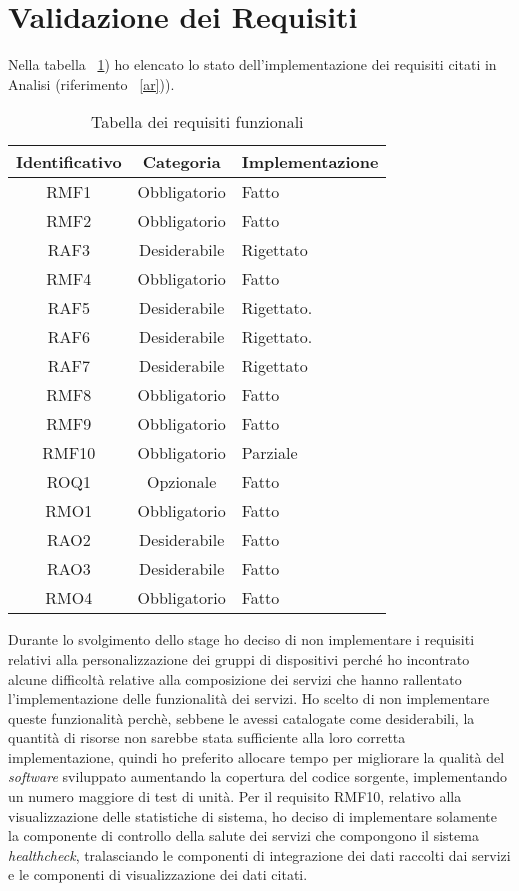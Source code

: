 \section{Validazione dei Requisiti}

Nella tabella ~\ref{tab:validazione-requisiti}) ho elencato lo stato dell'implementazione dei requisiti citati in Analisi (riferimento ~\ref{ar})).

\begin{table}[H]
\caption{Tabella dei requisiti funzionali}
\label{tab:validazione-requisiti}
\begin{tabularx}{\linewidth}{|c|c|X|}
\hline
\textbf{Identificativo} & \textbf{Categoria} & \textbf{Implementazione} \\
\hline
RMF1 & Obbligatorio & Fatto \\
\hline
RMF2 & Obbligatorio & Fatto \\
\hline
RAF3 & Desiderabile & Rigettato \\
\hline
RMF4 & Obbligatorio & Fatto \\
\hline
RAF5 & Desiderabile & Rigettato. \\
\hline
RAF6 & Desiderabile & Rigettato. \\
\hline
RAF7 & Desiderabile & Rigettato \\
\hline
RMF8 & Obbligatorio & Fatto \\
\hline
RMF9 & Obbligatorio & Fatto \\
\hline
RMF10 & Obbligatorio & Parziale \\
\hline
ROQ1 & Opzionale & Fatto \\
\hline
RMO1 & Obbligatorio & Fatto \\
\hline
RAO2 & Desiderabile & Fatto \\
\hline
RAO3 & Desiderabile & Fatto \\
\hline
RMO4 & Obbligatorio & Fatto \\
\hline
\end{tabularx}
\end{table}

Durante lo svolgimento dello stage ho deciso di non implementare i requisiti relativi alla personalizzazione dei gruppi di dispositivi perché ho incontrato alcune difficoltà relative alla composizione dei servizi che hanno rallentato l'implementazione delle funzionalità dei servizi. Ho scelto di non implementare queste funzionalità perchè, sebbene le avessi catalogate come desiderabili, la quantità di risorse non sarebbe stata sufficiente alla loro corretta implementazione, quindi ho preferito allocare tempo per migliorare la qualità del \emph{software} sviluppato aumentando la copertura del codice sorgente, implementando un numero maggiore di test di unità.
Per il requisito RMF10, relativo alla visualizzazione delle statistiche di sistema, ho deciso di implementare solamente la componente di controllo della salute dei servizi che compongono il sistema \emph{healthcheck}, tralasciando le componenti di integrazione dei dati raccolti dai servizi e le componenti di visualizzazione dei dati citati.

